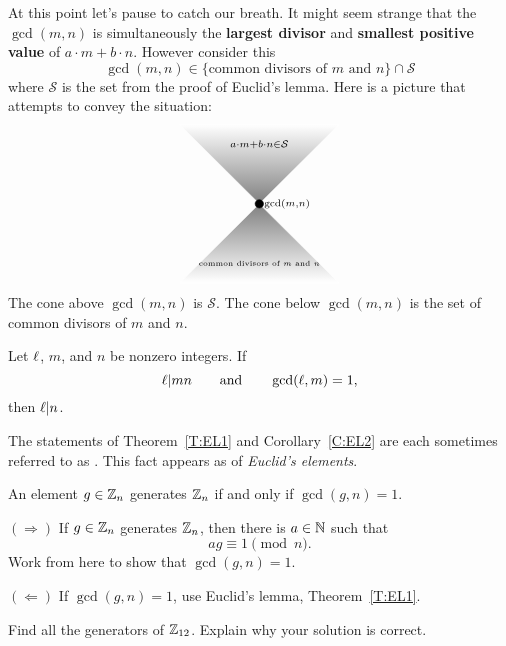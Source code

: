 \documentclass{ximera}
\begin{document}
At this point let's pause to catch our breath. It might seem strange
that the $\gcd(m,n)$ is simultaneously the \textbf{largest divisor} and
\textbf{smallest positive value} of $a\cdot m + b\cdot n$. However
consider this
\[
\gcd(m,n) \in \{\text{common divisors of $m$ and $n$}\}\cap \mathcal{S}
\]
where $\mathcal{S}$ is the set from the proof of Euclid's
lemma. Here is a picture that attempts to convey the situation:
\[
\begin{tikzpicture}
  \draw[white,thin,shading = axis, top color = white, bottom color = gray] (-2,2) -- (0,0)-- (2,2) -- (-2,2) -- cycle;
  \draw[white,thin,shading = axis, bottom color = white, top color = gray] (-2,-2) -- (0,0)-- (2,-2) -- (-2,-2) -- cycle;
  \filldraw (0,0) circle (3pt);
  \node[right] at (0,0) {$\scriptstyle\gcd(m,n)$};
  \node at (0,1.5) {$\scriptstyle a\cdot m + b\cdot n\in\mathcal{S}$};
  \node at (0,-1.5) {\text{\tiny common divisors of $m$ and $n$}};
\end{tikzpicture}
\]
The cone above $\gcd(m,n)$ is $\mathcal{S}$. The cone below
$\gcd(m,n)$ is the set of common divisors of $m$ and $n$.




\begin{corollary}\label{C:EL2}
  Let $\ell$, $m$, and $n$ be nonzero integers. If
  \[
  \ell|mn\qquad\text{and}\qquad \gcd(\ell,m)=1,
  \]
  then $\ell|n$. 
\end{corollary}


The statements of Theorem~\ref{T:EL1} and Corollary~\ref{C:EL2} are
each sometimes referred to as . This fact appears as  of
\textit{Euclid's elements}.



\begin{corollary}
  An element $g\in \mathbb Z_n$ generates $\mathbb Z_n$ if and only if $\gcd(g,n) =
  1$.
  \begin{sketch}
    $(\Rightarrow)$ If $g\in\mathbb Z_n$ generates $\mathbb Z_n$, then there is
    $a\in\mathbb N$ such that
    \[
    ag \equiv 1\pmod{n}.
    \]
    Work from here to show that $\gcd(g,n) = 1$.
    

    $(\Leftarrow)$ If $\gcd(g,n) = 1$, use Euclid's lemma,
    Theorem~\ref{T:EL1}.
  \end{sketch}
\end{corollary}

\begin{exercise}
  Find all the generators of $\mathbb Z_{12}$. Explain why your solution is correct.
\end{exercise}
\end{document}
